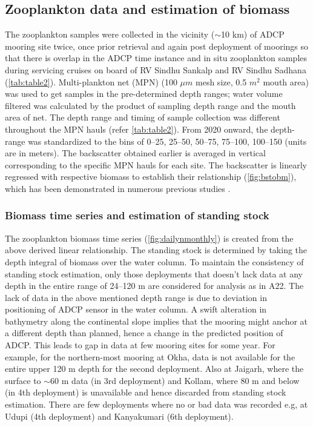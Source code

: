 \documentclass{article}
\begin{document}
	\subsection{Zooplankton data and estimation of biomass}
	The zooplankton  samples were collected in the vicinity ($\sim$10 km) of ADCP mooring site twice, once prior retrieval and again post deployment of moorings so that there is overlap in the ADCP time instance and in situ zooplankton samples during servicing cruises on board of RV Sindhu Sankalp and RV Sindhu Sadhana (\autoref{tab:table2}). Multi-plankton net (MPN) (100 $\mu m$ mesh size, 0.5 $m^2$ mouth area) was used to get samples in the pre-determined depth ranges; water volume filtered was calculated by the product of sampling depth range and the mouth area of net. The depth range and timing of sample collection was different throughout the MPN hauls (refer \autoref{tab:table2}). From 2020 onward, the depth-range was standardized to the bins of 0--25, 25--50, 50--75, 75--100, 100--150 (units are in meters). The backscatter obtained earlier is averaged in vertical corresponding to the specific MPN hauls for each site. The backscatter is linearly regressed with respective biomass to establish their relationship (\cref{fig:bstobm}), which has been demonstrated in numerous previous studies \citep{flagg1989use,heywood1991estimation,jiang2007temporal,aparna2022seasonal}.
	
	\subsubsection{Biomass time series and estimation of standing stock}
	\label{sec:biomasstimeseries}
	The zooplankton biomass time series (\cref{fig:dailynmonthly}) is created from the above derived linear relationship. The standing stock is determined by taking the depth integral of biomass over the water column. To maintain the consistency of standing stock estimation, only those deployments that doesn't lack data at any depth in the entire range of 24--120 m are considered for analysis as in A22. The lack of data in the above mentioned depth range is due to deviation in positioning of ADCP sensor in the water column. A swift alteration in bathymetry along the continental slope implies that the mooring might anchor at a different depth than planned, hence a change in the predicted position of ADCP. This leads to gap in data at few mooring sites for some year. For example, for the northern-most mooring at Okha, data is not available for the entire upper 120 m depth for the second deployment. Also at Jaigarh, where the surface to $\sim$60 m data (in 3rd deployment) and Kollam, where 80 m and below (in 4th deployment) is unavailable and hence discarded from standing stock estimation. There are few deployments where no or bad data was recorded e.g, at Udupi (4th deployment) and Kanyakumari (6th deployment).  	
\end{document}
